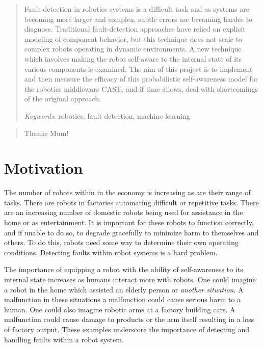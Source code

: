 \documentclass[11pt,a4paper]{article}
\begin{document}
\tableofcontents
\newpage
\begin{abstract}
  Fault-detection in robotics systems is a difficult task and as
  systems are becoming more larger and complex, subtle errors are
  becoming harder to diagnose. Traditional fault-detection approaches
  have relied on explicit modeling of component behavior, but this
  technique does not scale to complex robots operating in dynamic
  environments. A new technique which involves making the robot
  self-aware to the internal state of its various components is
  examined. The aim of this project is to implement and then measure
  the efficacy of this probabilistic self-awareness model for the
  robotics middleware CAST, and if time allows, deal with shortcomings
  of the original approach.

  \vspace{0.5cm}
  \noindent\textit{Keywords}: robotics, fault detection,
  machine learning
\end{abstract}
\newpage

\renewcommand{\abstractname}{Acknowledgments}
\begin{abstract}
  Thanks Mum!
\end{abstract}
\newpage

\section{Motivation}
\label{cha:motivation}
The number of robots within in the economy is increasing as are their
range of tasks. There are robots in factories automating difficult or
repetitive tasks. There are an increasing number of domestic robots
being used for assistance in the home or as entertainment. It is
important for these robots to function correctly, and if unable to do
so, to degrade gracefully to minimize harm to themselves and others.
To do this, robots need some way to determine their own operating
conditions. Detecting faults within robot systems is a hard problem.

The importance of equipping a robot with the ability of self-awareness
to its internal state increases as humans interact more with robots.
One could imagine a robot in the home which assisted an elderly person
or \textit{another situation}. A malfunction in these situations a
malfunction could cause serious harm to a human. One could also
imagine robotic arms at a factory building cars. A malfunction could
cause damage to products or the arm itself resulting in a loss of
factory output. These examples underscore the importance of detecting
and handling faults within a robot system.
\end{document}
